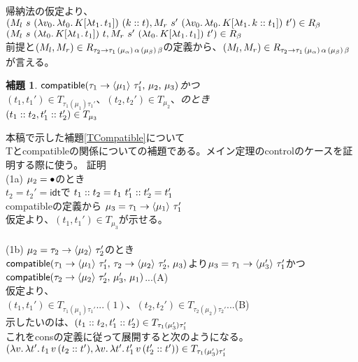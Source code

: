 \documentclass[japanese,draft]{jssst_ppl} %
\newtheorem{lemma}[definition]{補題}
\begin{document}
 帰納法の仮定より、\\
 $(M_l\ s \ \LamP{v_0}{\Lam{t_0}{K[\Lam{t_1}{t_1}]}}\ \ConsP{k}{t}, M_r\ s' \ \LamP{v_0}{\Lam{t_0}{K[\Lam{t_1}{\Cons{k}{t_1}}]}}\ t')\in R_{\beta}$\\
 $(M_l\ s \ \LamP{t_0}{K[\Lam{t_1}{t_1}]}\ t, M_r\ s' \ \LamP{t_0}{K[\Lam{t_1}{t_1}]}\ t')\in R_{\beta}$\\
 前提と$(M_l, M_r) \in R_{\TypeArrow{\tau_2}{\tau_1}{\mu_{\alpha}}{\alpha}{\mu_{\beta}}{\beta}}$の定義から、$(M_l, M_r) \in R_{\TypeArrow{\tau_2}{\tau_1}{\mu_{\alpha}}{\alpha}{\mu_{\beta}}{\beta}}$が言える。
\\
\setcounter{definition}{10}
\begin{lemma}
  $\Compatible{\Trail{\tau_1}{\tau_1'}{\mu_1}}{\mu_2}{\mu_3}$かつ$(t_1, t_1')\in T_{\tau_1(\mu_1)\tau_1'}、(t_2, t_2')\in T_{\mu_2}、$のとき\\
  $(\Cons{t_1}{t_2}, \Cons{t_1'}{t_2'})\in T_{\mu_3}$
\end{lemma}
本稿で示した補題\ref{TCompatible}について\\
Tと\textsf{compatible}の関係についての補題である。メイン定理の\textsf{control}のケースを証明する際に使う。
\lbrack 証明 \rbrack\\
(1a) $\mu_2=\Bullet$のとき\\
$t_2=t_2'=\textsf{idt}$で $\Cons{t_1}{t_2}=t_1\ \Cons{t_1'}{t_2'}=t_1'$\\
\textsf{compatible}の定義から $\mu_3 = \Trail{\tau_1}{\tau_1'}{\mu_1}$\\
仮定より、$(t_1,t_1')\in T_{\mu_3}$が示せる。\\
\\
(1b) $\mu_2=\Trail{\tau_2}{\tau_2'}{\mu_2}$のとき\\
$\Compatible{\Trail{\tau_1}{\tau_1'}{\mu_1}}{\Trail{\tau_2}{\tau_2'}{\mu_2}}{\mu_3}$より$\mu_3 = \Trail{\tau_1}{\tau_1'}{\mu_3'}$かつ$\Compatible{\Trail{\tau_2}{\tau_2'}{\mu_2}}{\mu_3'}{\mu_1}$...(A)\\
仮定より、\\
$(t_1, t_1')\in T_{\tau_1(\mu_1)\tau_1'}...(1)、(t_2, t_2')\in T_{\tau_2(\mu_2)\tau_2'}$...(B)\\
示したいのは、$(\Cons{t_1}{t_2}, \Cons{t_1'}{t_2'})\in T_{\tau_1(\mu_3')\tau_1'}$\\これを\textsf{cons}の定義に従って展開すると次のようになる。\\
$(\Lam{v}{\Lam{t'}{t_1\,v\,(\Cons{t_2}{t'})}}, \Lam{v}{\Lam{t'}{t_1'\,v\,(\Cons{t_2'}{t'})}})\in T_{\tau_1(\mu_3')\tau_1'}$\\
\end{document}
